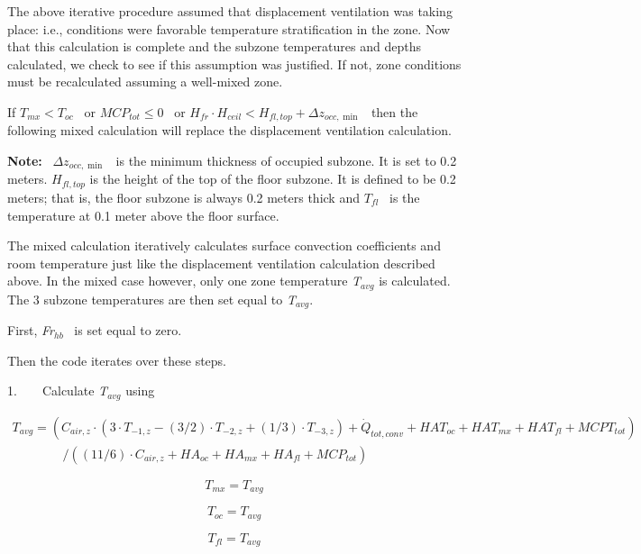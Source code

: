 The above iterative procedure assumed that displacement ventilation was taking place: i.e., conditions were favorable temperature stratification in the zone. Now that this calculation is complete and the subzone temperatures and depths calculated, we check to see if this assumption was justified. If not, zone conditions must be recalculated assuming a well-mixed zone.

If \({T_{mx}} < {T_{oc}}\) ~or \(MC{P_{tot}} \le 0\) ~or \({H_{fr}} \cdot {H_{ceil}} < {H_{fl,top}} + \Delta {z_{occ,\min }}\) ~then the following mixed calculation will replace the displacement ventilation calculation.

\textbf{Note:} ~\(\Delta {z_{occ,\min }}\) ~is the minimum thickness of occupied subzone. It is set to 0.2 meters. \({H_{fl,top}}\) is the height of the top of the floor subzone. It is defined to be 0.2 meters; that is, the floor subzone is always 0.2 meters thick and \({T_{fl}}\) ~is the temperature at 0.1 meter above the floor surface.

The mixed calculation iteratively calculates surface convection coefficients and room temperature just like the displacement ventilation calculation described above. In the mixed case however, only one zone temperature \emph{T\(_{avg}\)} is calculated. The 3 subzone temperatures are then set equal to \emph{T\(_{avg}\)}.

First, \emph{Fr\(_{hb}\)}~ is set equal to zero.

Then the code iterates over these steps.

1.~~~~Calculate \emph{T\(_{avg}\)} using

{\scriptsize
\begin{equation}
\begin{array}{l}
T_{avg} = (C_{air,z} \cdot (3 \cdot T_{ - 1,z} - (3/2) \cdot T_{ - 2,z} + (1/3) \cdot T_{ - 3,z}) + \dot Q_{tot,conv} + HAT_{oc} + HAT_{mx} + HAT_{fl} + MCPT_{tot}) \\
\quad \quad \quad \quad / ((11/6) \cdot C_{air,z} + HA_{oc} + HA_{mx} + HA_{fl} + MCP_{tot})
\end{array}
\end{equation}}

\begin{equation}
{T_{mx}} = {T_{avg}}
\end{equation}

\begin{equation}
{T_{oc}} = {T_{avg}}
\end{equation}

\begin{equation}
{T_{fl}} = {T_{avg}}
\end{equation}

